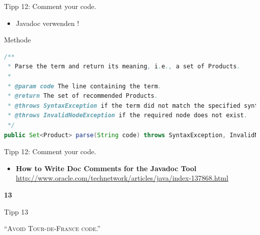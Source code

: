 \documentclass[18pt]{beamer}
\newcommand{\quotes}[1]{``#1''}
\begin{document}
\begin{frame}[fragile]{Tipp 12: Comment your code.}
    \begin{itemize}
        \item Javadoc verwenden !
    \end{itemize}
    \begin{exampleblock}{Methode}
        \begin{lstlisting}[language=Java,basicstyle=\tiny]
/**
 * Parse the term and return its meaning, i.e., a set of Products.
 *
 * @param code The line containing the term.
 * @return The set of recommended Products.
 * @throws SyntaxException if the term did not match the specified syntax rules.
 * @throws InvalidNodeException if the required node does not exist.
 */
public Set<Product> parse(String code) throws SyntaxException, InvalidNodeException { ... }
        \end{lstlisting}
    \end{exampleblock}
\end{frame}

\begin{frame}{Tipp 12: Comment your code.}
    \begin{itemize}
        \item \textbf{How to Write Doc Comments for the Javadoc Tool}\\
        \url{http://www.oracle.com/technetwork/articles/java/index-137868.html}
    \end{itemize}
\end{frame}

\begin{frame}{\quad}
    \center
    \Huge{\textbf{13}}
\end{frame}

\begin{frame}{Tipp 13}
    \begin{block}{}
        \center
        \textsc{\quotes{Avoid Tour-de-France code.}}
    \end{block}
\end{frame}
\end{document}
